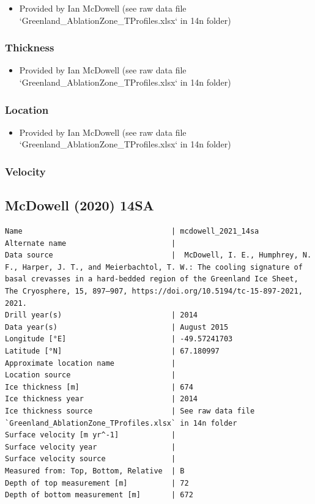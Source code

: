 \documentclass[article,a4paper,times,11pt,twoside]{article}
\begin{document}
\begin{itemize}
\item Provided by Ian McDowell (see raw data file `Greenland\_AblationZone\_TProfiles.xlsx` in 14n folder)
\end{itemize}

\subsubsection{Thickness}
\label{sec:org73ece8e}

\begin{itemize}
\item Provided by Ian McDowell (see raw data file `Greenland\_AblationZone\_TProfiles.xlsx` in 14n folder)
\end{itemize}

\subsubsection{Location}
\label{sec:orgb85a89a}

\begin{itemize}
\item Provided by Ian McDowell (see raw data file `Greenland\_AblationZone\_TProfiles.xlsx` in 14n folder)
\end{itemize}

\subsubsection{Velocity}
\label{sec:orgf256f08}
\clearpage
\subsection{McDowell (2020) 14SA}
\label{sec:orgd6642cb}
\begin{verbatim}
Name                                  | mcdowell_2021_14sa
Alternate name                        | 
Data source                           |  McDowell, I. E., Humphrey, N. F., Harper, J. T., and Meierbachtol, T. W.: The cooling signature of basal crevasses in a hard-bedded region of the Greenland Ice Sheet, The Cryosphere, 15, 897–907, https://doi.org/10.5194/tc-15-897-2021, 2021.
Drill year(s)                         | 2014
Data year(s)                          | August 2015
Longitude [°E]                        | -49.57241703
Latitude [°N]                         | 67.180997
Approximate location name             | 
Location source                       | 
Ice thickness [m]                     | 674
Ice thickness year                    | 2014
Ice thickness source                  | See raw data file `Greenland_AblationZone_TProfiles.xlsx` in 14n folder
Surface velocity [m yr^-1]            | 
Surface velocity year                 | 
Surface velocity source               | 
Measured from: Top, Bottom, Relative  | B
Depth of top measurement [m]          | 72
Depth of bottom measurement [m]       | 672
\end{verbatim}
\end{document}
